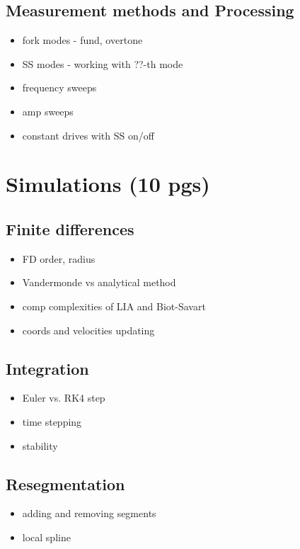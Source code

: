\documentclass[a4paper, 12pt]{report}
\newcommand{\<}{\langle} %
\renewcommand{\>}{\rangle} %
\begin{document}
\section{Measurement methods and Processing}
\begin{itemize}
	\item fork modes - fund, overtone
	\item SS modes - working with ??-th mode
	\item frequency sweeps
	\item amp sweeps
	\item constant drives with SS on/off
\end{itemize}

\newpage

\chapter{Simulations (10 pgs)}

\section{Finite differences}
\begin{itemize}
	\item FD order, radius
	\item Vandermonde vs analytical method
	\item comp complexities of LIA and Biot-Savart
	\item coords and velocities updating
\end{itemize}

\section{Integration }
\begin{itemize}
	\item Euler vs. RK4 step
	\item time stepping
	\item stability
\end{itemize}

\section{Resegmentation}
\begin{itemize}
	\item adding and removing segments
	\item local spline
\end{itemize}
\end{document}
